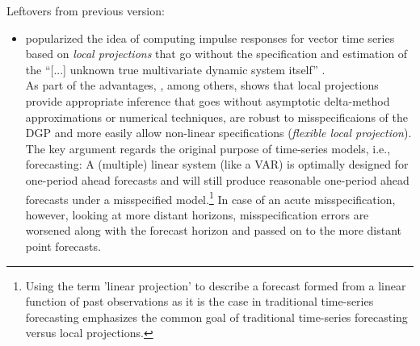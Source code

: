 \documentclass[a4paper,11pt,listof=nochaptergap,oneside,pointednumbers,bibtotoc,bigheadings,liststotoc]{scrbook}
\theoremstyle{mysatz}
\theoremstyle{mydefinition}
\theoremstyle{mybemerkung}
\begin{document}
\begingroup
    \fontsize{8pt}{12pt}\selectfont
    Leftovers from previous version:
\begin{itemize}
	\item \citet{jorda:05} popularized the idea of computing impulse responses for vector time series based on \textit{local projections} that go without the specification and estimation of the ``[...] unknown true multivariate dynamic system itself'' \citep[p. 1]{jorda:05}. \\
As part of the advantages, \citet{jorda:05}, among others, shows that local projections provide appropriate inference that goes without asymptotic delta-method approximations or numerical techniques, are robust to misspecificaions of the DGP and more easily allow non-linear specifications (\textit{flexible local projection}). The key argument regards the original purpose of time-series models, i.e., forecasting: A (multiple) linear system (like a VAR) is optimally designed for one-period ahead forecasts and will still produce reasonable one-period ahead forecasts under a misspecified model.\footnote{Using the term 'linear projection' to describe a forecast formed from a linear function of past observations as it is the case in traditional time-series forecasting emphasizes the common goal of traditional time-series forecasting versus local projections.} In case of an acute misspecification, however, looking at more distant horizons, misspecification errors are worsened along with the forecast horizon and passed on to the more distant point forecasts. 


\end{itemize}
\end{document}
